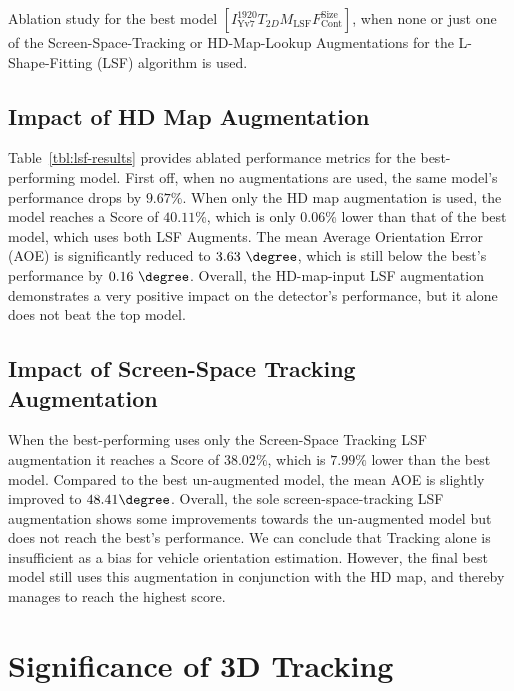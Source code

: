 \begin{table}[h!]
    
    \caption{Ablation study for the best model $\left[I^{1920}_\text{Yv7}T_{2D}M_\text{LSF}F_\text{Cont}^\text{Size}\right]$, when none or just one of the Screen-Space-Tracking or HD-Map-Lookup Augmentations for the L-Shape-Fitting (LSF) algorithm is used.}
    \label{tbl:lsf-results}
\end{table}

\subsection{Impact of HD Map Augmentation}
\label{subsec:impactmap}

Table~\ref{tbl:lsf-results} provides ablated performance metrics for the best-performing model.
First off, when no augmentations are used, the same model's performance drops by $9.67$\%.
When only the HD map augmentation is used, the model reaches a Score of $40.11$\%, which is only $0.06$\% lower than that of the best model, which uses both LSF Augments.
The mean Average Orientation Error (AOE) is significantly reduced to $3.63~\degree$, which is still below the best's performance by $0.16~\degree$.
Overall, the HD-map-input LSF augmentation demonstrates a very positive impact on the detector's performance, but it alone does not beat the top model.

\subsection{Impact of Screen-Space Tracking Augmentation}
\label{subsec:impactlsf}

When the best-performing uses only the Screen-Space Tracking LSF augmentation it reaches a Score of $38.02\%$, which is $7.99\%$ lower than the best model.
Compared to the best un-augmented model, the mean AOE is slightly improved to $48.41\degree$.
Overall, the sole screen-space-tracking LSF augmentation shows some improvements towards the un-augmented model but does not reach the best's performance.
We can conclude that Tracking alone is insufficient as a bias for vehicle orientation estimation.
However, the final best model still uses this augmentation in conjunction with the HD map, and thereby manages to reach the highest score.


\section{Significance of 3D Tracking}
\label{sec:impacttracking}

